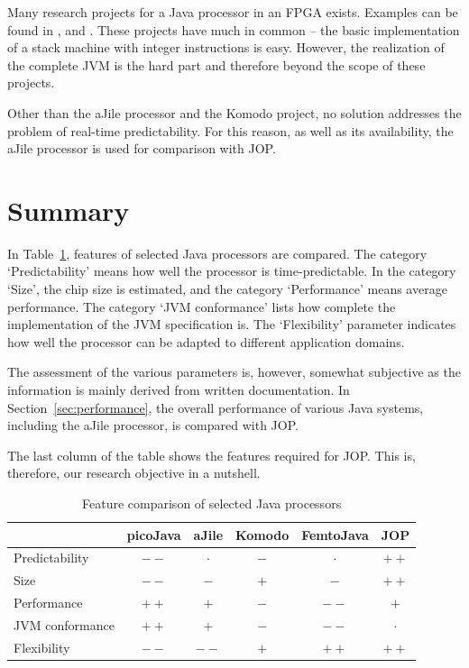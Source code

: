 Many research projects for a Java processor in an FPGA exists.
Examples can be found in \cite{Femto01}, \cite{Kim2000} and
\cite{368445}. These projects have much in common -- the basic
implementation of a stack machine with integer instructions is easy.
However, the realization of the complete JVM is the hard part and
therefore beyond the scope of these projects.

Other than the aJile processor and the Komodo project, no solution
addresses the problem of real-time predictability. For this reason,
as well as its availability, the aJile processor is used for
comparison with JOP.

\section{Summary}
\label{sec:related:summary}

In Table~\ref{tab:related:plus:minus}, features of selected Java
processors are compared. The category `Predictability' means how well
the processor is time-predictable. In the category `Size', the chip
size is estimated, and the category `Performance' means average
performance. The category `JVM conformance' lists how complete the
implementation of the JVM specification \cite{jvm} is. The
`Flexibility' parameter indicates how well the processor can be
adapted to different application domains.

The assessment of the various parameters is, however, somewhat
subjective as the information is mainly derived from written
documentation. In Section~\ref{sec:performance}, the overall
performance of various Java systems, including the aJile processor,
is compared with JOP.

The last column of the table shows the features required for JOP.
This is, therefore, our research objective in a nutshell.

\begin{table}[htp]
    \centering
    \begin{tabular}{lccccc}
        \toprule
                        & picoJava & aJile   & Komodo  & FemtoJava & JOP     \\
        \midrule
        Predictability  & $--$     & $\cdot$ & $-$     & $\cdot$   & $++$    \\
        Size            & $--$     & $-$     & $+$     & $-$       & $++$    \\
        Performance     & $++$     & $+$     & $-$     & $--$      & $+$     \\
        JVM conformance & $++$     & $+$     & $-$     & $--$      & $\cdot$ \\
        Flexibility     & $--$     & $--$    & $+$     & $++$      & $++$    \\
        \bottomrule
    \end{tabular}
    \caption{Feature comparison of selected Java processors}
    \label{tab:related:plus:minus}
\end{table}

